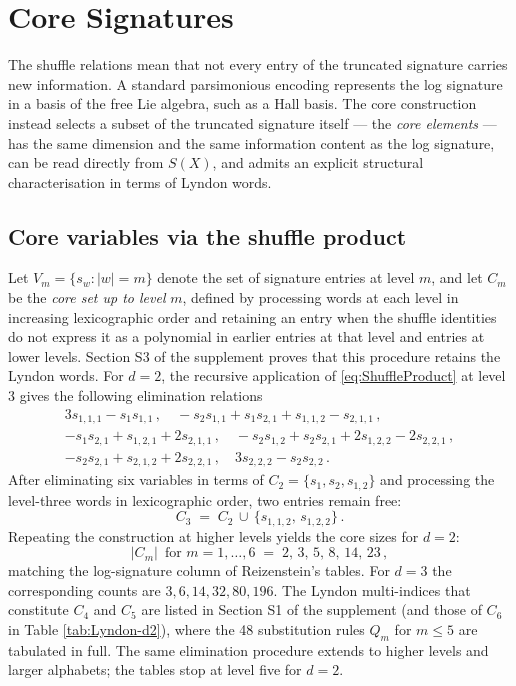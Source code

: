 \documentclass[11pt,english]{article}
\theoremstyle{definition}
\theoremstyle{remark}
\begin{document}
\section{Core Signatures\label{sec:Core}}

The shuffle relations mean that not every entry of the truncated signature
carries new information. A standard parsimonious encoding represents
the log signature in a basis of the free Lie algebra, such as a Hall
basis. The core construction instead selects a subset of
the truncated signature itself --- the \emph{core elements} --- has
the same dimension and the same information content as the log signature,
can be read directly from $S(X)$, and admits an explicit structural
characterisation in terms of Lyndon words.

\subsection{Core variables via the shuffle product}

Let $V_{m}=\{s_{w}:|w|=m\}$ denote the set of signature entries at
level $m$, and let $C_{m}$ be the \emph{core set up to level} $m$,
defined by processing words at each level in increasing lexicographic
order and retaining an entry when the shuffle identities do not express
it as a polynomial in earlier entries at that level and entries at lower
levels. Section S3 of the supplement proves that this procedure retains the Lyndon words.
For $d=2$, the recursive application of \eqref{eq:ShuffleProduct}
at level 3 gives the following elimination relations
\[
\begin{array}{l}
3s_{1,1,1}-s_{1}s_{1,1}\,,\quad-s_{2}s_{1,1}+s_{1}s_{2,1}+s_{1,1,2}-s_{2,1,1}\,,\\
-s_{1}s_{2,1}+s_{1,2,1}+2s_{2,1,1}\,,\quad-s_{2}s_{1,2}+s_{2}s_{2,1}+2s_{1,2,2}-2s_{2,2,1}\,,\\
-s_{2}s_{2,1}+s_{2,1,2}+2s_{2,2,1}\,,\quad3s_{2,2,2}-s_{2}s_{2,2}\,.
\end{array}
\]
After eliminating six variables in terms of $C_{2}=\{s_{1},s_{2},s_{1,2}\}$
and processing the level-three words in lexicographic order, two entries
remain free:
\[
C_{3}\;=\;C_{2}\,\cup\,\{s_{1,1,2},\,s_{1,2,2}\}\,.
\]
Repeating the construction at higher levels yields the core sizes
for $d=2$:
\begin{equation}
|C_{m}|\,\text{ for }m=1,\ldots,6\;=\;2,\,3,\,5,\,8,\,14,\,23\,,\label{eq:CoreSizesD2}
\end{equation}
matching the log-signature column of Reizenstein's tables. For $d=3$
the corresponding counts are $3,6,14,32,80,196$. The
Lyndon multi-indices that constitute $C_{4}$ and $C_{5}$ are listed
in Section S1 of the supplement (and those of $C_{6}$ in Table
\ref{tab:Lyndon-d2}), where the 48 substitution rules $Q_{m}$ for
$m\leq5$ are tabulated in full. The same elimination procedure extends
to higher levels and larger alphabets; the tables stop at level five
for $d=2$.
\end{document}
